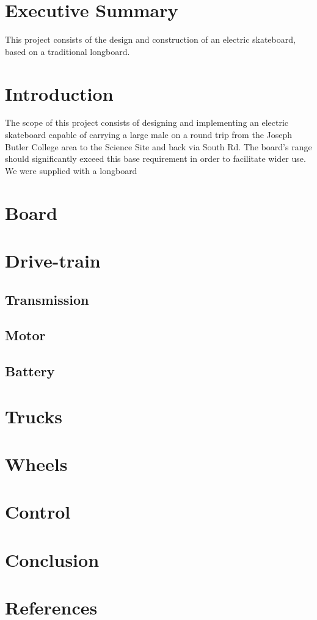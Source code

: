 \documentclass[journal,10pt]{IEEEtran}
\begin{document}
\section{Executive Summary}
    This project consists of the design and construction of an electric skateboard, based on a traditional longboard.
\section{Introduction}
    The scope of this project consists of designing and implementing an electric skateboard capable of carrying a large male on a round trip from the Joseph Butler College area to the Science Site and back via South Rd. The board's range should significantly exceed this base requirement in order to facilitate wider use. We were supplied with a longboard 
\section{Board}
\section{Drive-train}
    \subsection{Transmission}
    \subsection{Motor}
    \subsection{Battery}
\section{Trucks}
\section{Wheels}
\section{Control}
\section{Conclusion}
\section{References}
\end{document}
